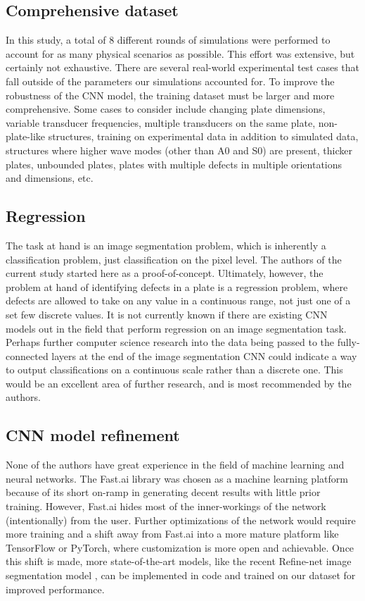 \documentclass[11pt,letterpaper]{article}
\begin{document}
		\subsection{Comprehensive dataset}
		In this study, a total of 8 different rounds of simulations were performed to account for as many physical scenarios as possible. This effort was extensive, but certainly not exhaustive. There are several real-world experimental test cases that fall outside of the parameters our simulations accounted for. To improve the robustness of the CNN model, the training dataset must be larger and more comprehensive. Some cases to consider include changing plate dimensions, variable transducer frequencies, multiple transducers on the same plate, non-plate-like structures, training on experimental data in addition to simulated data, structures where higher wave modes (other than A0 and S0) are present, thicker plates, unbounded plates, plates with multiple defects in multiple orientations and dimensions, etc.
		\subsection{Regression}
		The task at hand is an image segmentation problem, which is inherently a classification problem, just classification on the pixel level. The authors of the current study started here as a proof-of-concept. Ultimately, however, the problem at hand of identifying defects in a plate is a regression problem, where defects are allowed to take on any value in a continuous range, not just one of a set few discrete values. It is not currently known if there are existing CNN models out in the field that perform regression on an image segmentation task. Perhaps further computer science research into the data being passed to the fully-connected layers at the end of the image segmentation CNN could indicate a way to output classifications on a continuous scale rather than a discrete one. This would be an excellent area of further research, and is most recommended by the authors.
		\subsection{CNN model refinement}
		None of the authors have great experience in the field of machine learning and neural networks. The Fast.ai library was chosen as a machine learning platform because of its short on-ramp in generating decent results with little prior training. However, Fast.ai hides most of the inner-workings of the network (intentionally) from the user. Further optimizations of the network would require more training and a shift away from Fast.ai into a more mature platform like TensorFlow or PyTorch, where customization is more open and achievable. Once this shift is made, more state-of-the-art models, like the recent Refine-net image segmentation model \cite{8618363}, can be implemented in code and trained on our dataset for improved performance.
\end{document}
